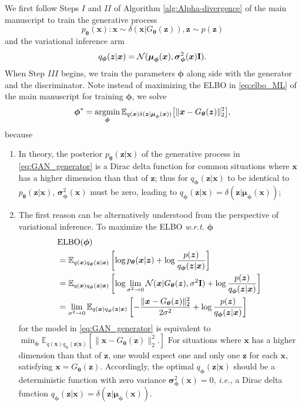 \documentclass[letterpaper]{article} %
\newcommand{\beq}{\begin{equation}}
\newcommand{\eeq}{\end{equation}}
\newcommand{\bali}{\begin{aligned}}
\newcommand{\eali}{\end{aligned}}
\newcommand{\Nc}[0]{\ensuremath{\mathcal{N}} }
\newcommand{\Ebb}[0]{\ensuremath{\mathbb{E}} }
\newcommand{\ie}[0]{\emph{i.e., }}
\newcommand{\wrt}[0]{\emph{w.r.t. }}
\newcommand{\Imat}[0]{\ensuremath{{\bf I}} }
\newcommand{\xv}[0]{\ensuremath{\boldsymbol{x}} }
\newcommand{\zv}[0]{\ensuremath{\boldsymbol{z}} }
\newcommand{\thetav}[0]{\ensuremath{\boldsymbol{\theta}} }
\newcommand{\muv}[0]{\ensuremath{\boldsymbol{\mu}} }
\newcommand{\sigmav}[0]{\ensuremath{\boldsymbol{\sigma}} }
\newcommand{\phiv}[0]{\ensuremath{\boldsymbol{\phi}} }
\newcommand{\argmin}{\operatornamewithlimits{argmin}}
\begin{document}
We first follow Steps $I$ and $I\!I$ of Algorithm \ref{alg:Alpha-divergence} of the main manuscript to train the generative process 
\beq\label{eq:GAN_generator}
p_{\thetav}(\xv): \xv \sim \delta(\xv | G_{\thetav}(\zv)), \zv \sim p(\zv)
\eeq
and the variational inference arm 
$$
q_{\phiv}(\zv|\xv)=\Nc(\muv_{\phiv}(\xv), \sigmav^2_{\phiv}(\xv)\Imat).
$$
When Step $I\!I\!I$ begins, we train the parameters $\phiv$ along side with the generator and the discriminator. Note instead of maximizing the ELBO in \eqref{eq:elbo_ML} of the main manuscript for training $\phiv$, we solve 
\beq\label{eq:}
\bali
\phiv^{*} = \argmin_{\phiv}  
\Ebb_{q(\xv) \delta(\zv|\muv_{\phiv}(\xv))} \big[
\| \xv - G_{\thetav}(\zv) \|_2^2
\big],
\eali
\eeq
because
\begin{enumerate}
	\item In theory, the posterior $p_{\thetav}(\zv|\xv)$ of the generative process in \eqref{eq:GAN_generator} is a Dirac delta function for common situations where $\xv$ has a higher dimension than that of $\zv$; thus for $q_{\phiv}(\zv|\xv)$ to be identical to $p_{\thetav}(\zv|\xv)$, $\sigmav^2_{\phiv}(\xv)$ must be zero, leading to $q_{\phiv}(\zv|\xv) = \delta(\zv|\muv_{\phiv}(\xv))$;
	
	\item The first reason can be alternatively understood from the perspective of variational inference. To maximize the ELBO \wrt \phiv 
	\beq\label{eq:}
	\bali
	& \text{ELBO}(\phiv) 
	\\
	& = \Ebb_{q(\xv) q_{\phiv}(\zv|\xv)} \left[
	\log p_{\thetav}(\xv | \zv) + \log \frac{p(\zv)}{q_{\phiv}(\zv|\xv)}
	\right]
	\\
	& = \Ebb_{q(\xv) q_{\phiv}(\zv|\xv)} \left[
	\log \lim_{\sigma^2 \to 0} \Nc(\xv | G_{\thetav}(\zv), \sigma^2\Imat ) + \log \frac{p(\zv)}{q_{\phiv}(\zv|\xv)}
	\right]
	\\
	& = \lim_{\sigma^2 \to 0} \Ebb_{q(\xv) q_{\phiv}(\zv|\xv)} \left[
	-\frac{\|\xv - G_{\thetav}(\zv)\|_2^2}{2\sigma^2} + \log \frac{p(\zv)}{q_{\phiv}(\zv|\xv)}
	\right]
	\eali
	\eeq
	for the model in \eqref{eq:GAN_generator} is equivalent to $
	\min_{\phiv} \Ebb_{q(\xv) q_{\phiv}(\zv|\xv)} \left[
	\|\xv - G_{\thetav}(\zv)\|_2^2.
	\right]$
	For situations where $\xv$ has a higher dimension than that of $\zv$, one would expect one and only one $\zv$ for each $\xv$, satisfying $\xv = G_{\thetav}(\zv)$. Accordingly, the optimal $q_{\phiv}(\zv|\xv)$ should be a deterministic function with zero variance $\sigmav^2_{\phiv}(\xv)=0$, \ie a Dirac delta function $q_{\phiv}(\zv|\xv) = \delta(\zv|\muv_{\phiv}(\xv))$.
	
	
	
\end{enumerate}
\end{document}
